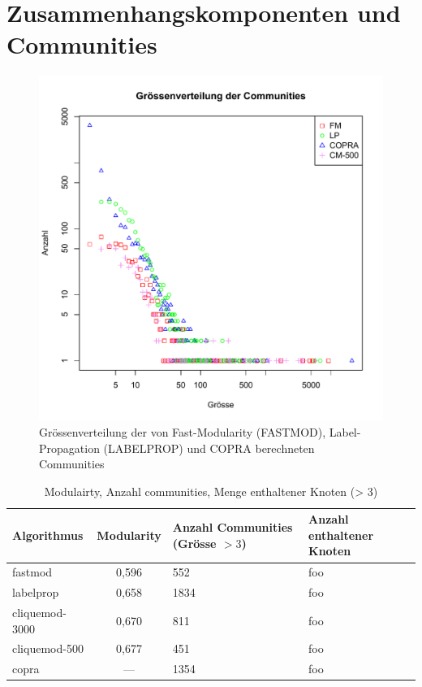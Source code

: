 \section{Zusammenhangskomponenten und Communities}
\label{sec:result-zusamm-und-comm}

\begin{figure}[h]
  \centering
  \includegraphics[scale=0.8]{images/community-size-dist.pdf}
  \caption{Gr\"ossenverteilung der von Fast-Modularity (FASTMOD),
    Label-Propagation (LABELPROP) und COPRA berechneten Communities}
  \label{fig:community-size-dist}
\end{figure}

\begin{table}[h]
  \centering
  \begin{tabular}{l|c|p{4cm}|p{4cm}}
    Algorithmus & Modularity & Anzahl Communities (Gr\"osse $> 3$) &
    Anzahl enthaltener Knoten \\
    \hline
    fastmod & 0,596 & 552 & foo \\
    labelprop & 0,658 & 1834 & foo \\
    cliquemod-3000 & 0,670 & 811 & foo \\
    cliquemod-500 & 0,677 & 451 & foo \\
    copra & --- & 1354 & foo
  \end{tabular}
  \caption{Modulairty, Anzahl communities, Menge enthaltener Knoten (> 3)}
  \label{tab:foo}
\end{table}

